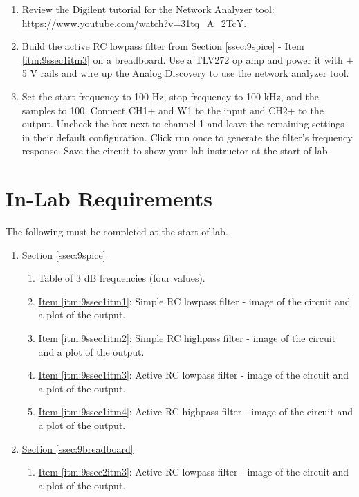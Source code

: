 \begin{enumerate}
	\item Review the Digilent tutorial for the Network Analyzer tool: \url{https://www.youtube.com/watch?v=31tq_A_2TcY}.
	\item Build the active RC lowpass filter from \hyperref[itm:9ssec1itm3]{Section \ref*{ssec:9spice} - Item \ref*{itm:9ssec1itm3}} on a breadboard. Use a TLV272 op amp and power it with $\pm$ 5 V rails and wire up the Analog Discovery to use the network analyzer tool. \label{itm:9ssec2itm2}
	\item Set the start frequency to 100 Hz, stop frequency to 100 kHz, and the samples to 100. Connect CH1+ and W1 to the input and CH2+ to the output. Uncheck the box next to channel 1 and leave the remaining settings in their default configuration. Click run once to generate the filter's frequency response. Save the circuit to show your lab instructor at the start of lab. \label{itm:9ssec2itm3}
\end{enumerate}


\section{In-Lab Requirements}

The following must be completed at the start of lab. 

\begin{enumerate}
	\item \hyperref[ssec:9spice]{Section \ref*{ssec:9spice}}
	\begin{enumerate}
		\item Table of 3 dB frequencies (four values).
		\item \hyperref[itm:9ssec1itm1]{Item \ref*{itm:9ssec1itm1}}: Simple RC lowpass filter - image of the circuit and a plot of the output.
		\item \hyperref[itm:9ssec1itm2]{Item \ref*{itm:9ssec1itm2}}: Simple RC highpass filter - image of the circuit and a plot of the output.
		\item \hyperref[itm:9ssec1itm3]{Item \ref*{itm:9ssec1itm3}}: Active RC lowpass filter - image of the circuit and a plot of the output.
		\item \hyperref[itm:9ssec1itm4]{Item \ref*{itm:9ssec1itm4}}: Active RC highpass filter - image of the circuit and a plot of the output.
	\end{enumerate}
	\item \hyperref[ssec:9breadboard]{Section \ref*{ssec:9breadboard}}
	\begin{enumerate}
		\item \hyperref[itm:9ssec2itm3]{Item \ref*{itm:9ssec2itm3}}: Active RC lowpass filter - image of the circuit and a plot of the output.
	\end{enumerate}
\end{enumerate}

